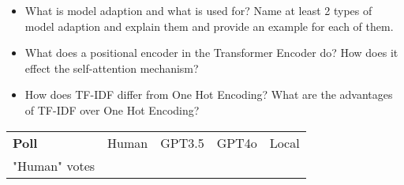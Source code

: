 {\begin{tcolorbox}[skin=widget,
    	coltitle=black,
    	colframe=s-group3!30,
    	colback=s-group3!10,
    	fontupper=\scriptsize,
    	adjusted title=\normalsize{Group 3},
    	boxrule=2mm]
\begin{itemize}
    	\end{itemize}
    \end{tcolorbox}
       	
     \begin{tcolorbox}[skin=widget,
    	coltitle=black,
    	colframe=s-group4!30,
    	colback=s-group4!10,
    	fontupper=\scriptsize,
    	adjusted title=\normalsize{Group 4},
    	boxrule=2mm]
    	\begin{itemize}
    		\setlength\itemsep{-0.2em}
    		\item What is model adaption and what is used for? Name at least 2 types of model adaption and explain them and provide an example for each of them.
    		\item What does a positional encoder in the Transformer Encoder do? How does it effect the self-attention mechanism?
    		\item How does TF-IDF differ from One Hot Encoding? What are the advantages of TF-IDF over One Hot Encoding?

    	\end{itemize}
    \end{tcolorbox}
    
	\vspace*{-1.5cm}
    \begin{tikztable}
	\begin{tabularx}{17.5cm}{Y|Y|Y|Y|Y}
		\textbf{Poll} & Human   &  GPT3.5  & GPT4o  & Local \\[5pt]
		"Human" votes &&&& \\
	\end{tabularx}
    \end{tikztable}
}

